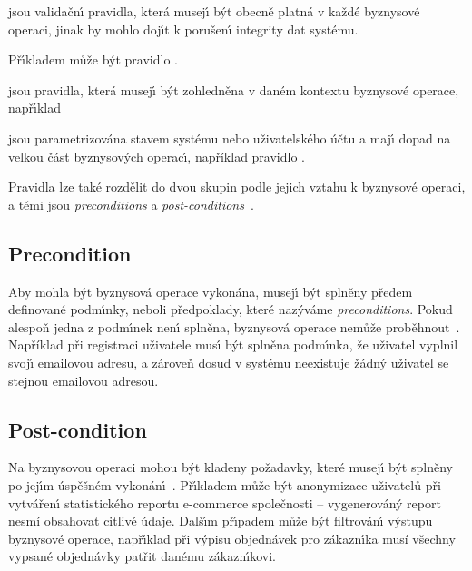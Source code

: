 \begin{description}
    \item [Bezkontextová pravidla] jsou validačn\'{\i} pravidla, která musej\'{\i} b\'yt obecně platná
    v každé byznysové operaci, jinak by mohlo doj\'{\i}t k porušen\'{\i} integrity dat systému.
    \item Př\'{\i}kladem může b\'yt pravidlo .
    \item [Kontextová pravidla] jsou pravidla, která musej\'{\i} b\'yt zohledněna v daném kontextu
    byznysové operace, např\'{\i}klad 
    \item [Průřezová pravidla] jsou parametrizována stavem systému nebo uživatelského účtu a maj\'{\i}
    dopad na velkou část byznysov\'ych operac\'{\i}, například pravidlo .
\end{description}

Pravidla lze také rozdělit do dvou skupin podle jejich vztahu k byznysové operaci, a těmi jsou
\textit{preconditions} a \textit{post-conditions}~\cite{cemus2015automated}.

\subsection{Precondition}

Aby mohla b\'yt byznysová operace vykonána, musej\'{\i}
b\'yt splněny předem definované podm\'{\i}nky, neboli předpoklady,
které naz\'yváme \textit{preconditions}. Pokud alespoň jedna z podm\'{\i}nek
nen\'{\i} splněna, byznysová operace nemůže proběhnout~\cite{larman2001patterns}.
Například při registraci uživatele mus\'{\i} b\'yt splněna podm\'{\i}nka,
že uživatel vyplnil svoj\'{\i} emailovou adresu, a zároveň
dosud v systému neexistuje žádn\'y uživatel se stejnou emailovou adresou.

\subsection{Post-condition}

Na byznysovou operaci mohou b\'yt kladeny požadavky, které
musej\'{\i} b\'yt splněny po jej\'{\i}m úspěšném vykonán\'{\i}~\cite{cemus2015automated}.
Př\'{\i}kladem může b\'yt anonymizace uživatelů při vytvářen\'{\i} statistického
reportu e-commerce společnosti -- vygenerováný report
nesmí obsahovat citlivé údaje. Dalš\'{\i}m př\'{\i}padem může b\'yt filtrován\'{\i}
v\'ystupu byznysové operace, např\'{\i}klad při v\'ypisu objednávek pro zákazn\'{\i}ka
musí všechny vypsané objednávky patřit danému zákazn\'{\i}kovi.

